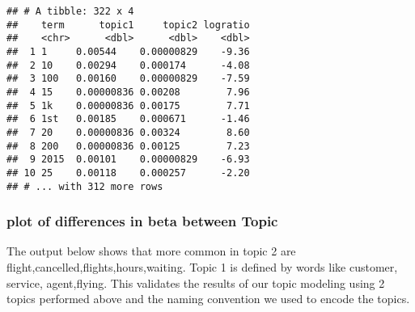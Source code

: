 \documentclass[
]{article}
\newenvironment{Shaded}{\begin{snugshade}}{\end{snugshade}}
\newcommand{\CommentTok}[1]{\textcolor[rgb]{0.56,0.35,0.01}{\textit{#1}}}
\newcommand{\DataTypeTok}[1]{\textcolor[rgb]{0.13,0.29,0.53}{#1}}
\newcommand{\FloatTok}[1]{\textcolor[rgb]{0.00,0.00,0.81}{#1}}
\newcommand{\KeywordTok}[1]{\textcolor[rgb]{0.13,0.29,0.53}{\textbf{#1}}}
\newcommand{\NormalTok}[1]{#1}
\newcommand{\OperatorTok}[1]{\textcolor[rgb]{0.81,0.36,0.00}{\textbf{#1}}}
\newcommand{\StringTok}[1]{\textcolor[rgb]{0.31,0.60,0.02}{#1}}
\begin{document}
\begin{Shaded}
\end{Shaded}

\begin{verbatim}
## # A tibble: 322 x 4
##    term      topic1     topic2 logratio
##    <chr>      <dbl>      <dbl>    <dbl>
##  1 1     0.00544    0.00000829    -9.36
##  2 10    0.00294    0.000174      -4.08
##  3 100   0.00160    0.00000829    -7.59
##  4 15    0.00000836 0.00208        7.96
##  5 1k    0.00000836 0.00175        7.71
##  6 1st   0.00185    0.000671      -1.46
##  7 20    0.00000836 0.00324        8.60
##  8 200   0.00000836 0.00125        7.23
##  9 2015  0.00101    0.00000829    -6.93
## 10 25    0.00118    0.000257      -2.20
## # ... with 312 more rows
\end{verbatim}

\hypertarget{plot-of-differences-in-beta-between-topic}{%
\subsubsection{plot of differences in beta between
Topic}\label{plot-of-differences-in-beta-between-topic}}

The output below shows that more common in topic 2 are
flight,cancelled,flights,hours,waiting. Topic 1 is defined by words like
customer, service, agent,flying. This validates the results of our topic
modeling using 2 topics performed above and the naming convention we
used to encode the topics.
\end{document}
